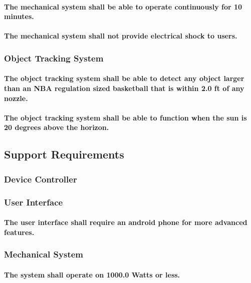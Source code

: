 \paragraph{The mechanical system shall be able to operate continuously for 10 minutes. }
\paragraph{The mechanical system shall not provide electrical shock to users. }

\subsubsection{Object Tracking System}
\paragraph{The object tracking system shall be able to detect any object larger than an NBA regulation sized basketball that is within 2.0 ft of any nozzle.}
\paragraph{The object tracking system shall be able to function when the sun is 20 degrees above the horizon. }%

\subsection{Support Requirements}

\subsubsection{Device Controller}

\subsubsection{User Interface}
\paragraph{The user interface shall require an android phone for more advanced features. }

\subsubsection{Mechanical System}
\paragraph{The system shall operate on 1000.0 Watts or less.}
